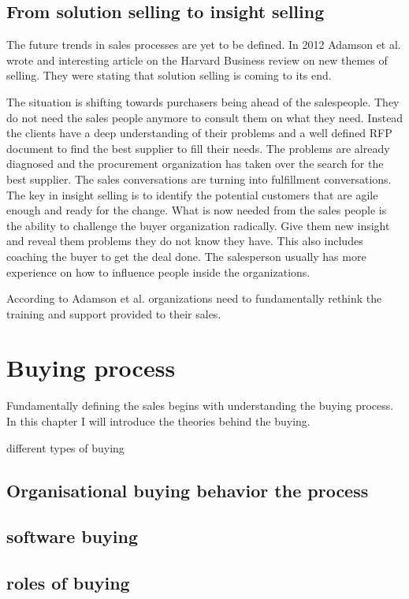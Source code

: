 \documentclass[12pt,a4paper,oneside,pdftex]{report}
\begin{document}
\subsection{From solution selling to insight selling}
The future trends in sales processes are yet to be defined. In 2012 Adamson et al. wrote and interesting article on the Harvard Business review on new themes of selling. They were stating that solution selling is coming to its end. 

The situation is shifting towards purchasers being ahead of the salespeople. They do not need the sales people anymore to consult them on what they need. Instead the clients have a deep understanding of their problems and a well defined RFP document to find the best supplier to fill their needs. The problems are already diagnosed and the procurement organization has taken over the search for the best supplier. The sales conversations are turning into fulfillment conversations. 
The key in insight selling is to identify the potential customers that are agile enough and ready for the change. What is now needed from the sales people is the ability to challenge the buyer organization radically. Give them new insight and reveal them problems they do not know they have. 
This also includes coaching the buyer to get the deal done. The salesperson usually has more experience on how to influence people inside the organizations. 

According to Adamson et al. organizations need to fundamentally rethink the training and support provided to their sales. 

\section{Buying process}


Fundamentally defining the sales begins with understanding the buying process. In this chapter I will introduce the theories behind the buying. 

different types of buying

\subsection{Organisational buying behavior the process}

\subsection{software buying}

\subsection{roles of buying}
\end{document}
